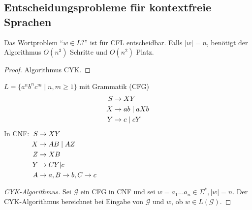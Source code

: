 {
\subsection{Entscheidungsprobleme für kontextfreie Sprachen}
\begin{Satz}[name={[Wortproblem für \acs*{CFL} entscheidbar]}]
	Das Wortproblem "`$w\in L?$"' ist für \ac{CFL} entscheidbar. Falls $|w|=n$, benötigt der Algorithmus $O(n^3)$ Schritte und $O(n^2)$ Platz.
\end{Satz}
\begin{proof}
	Algorithmus \ac{CYK}.
\end{proof}
\begin{Bsp}
	$L=\{a^nb^nc^m \mid n,m\geq 1\}$ mit Grammatik (\acs{CFG})
	\begin{align*}
		S &\-> XY\\
		X &\-> ab \mid aXb\\
		Y &\-> c \mid cY
	\end{align*}
	In CNF:
	$\begin{aligned}[t]
		S &\-> XY\\
		X &\-> AB \mid AZ\\
		Z &\-> XB\\
		Y &\-> CY | c\\
		A &\-> a, B \-> b, C \-> c
	\end{aligned}$
\end{Bsp}

\begin{proof}[CYK-Algorithmus] Sei $\mathcal{G}$ ein CFG in CNF und sei $w = a_1\dots a_n\in\Sigma^*, |w|=n$. Der CYK-Algorithmus bereichnet bei Eingabe von $\mathcal{G}$ und $w$, ob $w\in L(\mathcal{G})$.
		

\end{proof}}
